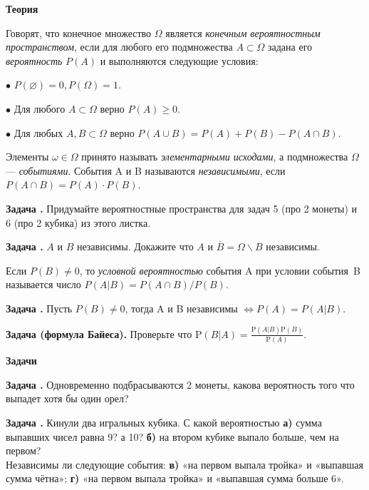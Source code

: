 \documentclass[11pt,a4paper]{article}
\def\P{\mathrm{P}}
\newcounter{znum}
\newcommand{\z}[1]{\addtocounter{znum}{1} \textbf{Задача \arabic{znum}#1. }}
\renewcommand{\!}{\textcolor{red}{!}}
\begin{document}
\pagestyle{empty}


\begin{center}
	\large
	\textbf{Теория}
	\normalsize
\end{center}

Говорят, что конечное множество $\Omega$ является \emph{конечным вероятностным пространством}, если для любого его подмножества $A \subset \Omega$ задана его \emph{вероятность} $P(A)$ и выполняются следующие условия:

$\bullet$ $P(\varnothing) = 0, P(\Omega) = 1$.

$\bullet$ Для любого $A \subset \Omega$ верно $P(A) \geqslant 0$.

$\bullet$ Для любых $A, B\subset \Omega$ верно $P(A\cup B) = P(A) + P(B) - P(A\cap B)$.

Элементы $\omega \in \Omega$ принято называть \emph{элементарными исходами}, а подмножества $\Omega$ --- \emph{событиями}. События A и B называются \emph{независимыми}, если $P(A \cap B) = P(A) \cdot P(B)$.

\z{} Придумайте вероятностные пространства для задач 5 (про 2 монеты) и 6 (про 2 кубика) из этого листка.

\z{} $A$ и $B$ независимы. Докажите что $A$ и $\overline{B} = \Omega \backslash B$ независимы.

\vspace{0.3cm}

Если $P(B) \ne 0$, то \emph{условной вероятностью} события A при условии события~B называется число $P(A|B) = P(A \cap B)/P(B)$.

\vspace{0.3cm}

\z{} Пусть $P(B) \ne 0$, тогда A и B независимы $ \Leftrightarrow P(A) = P(A|B)$.

\z{ (формула Байеса)} Проверьте что $\P(B | A) = \frac{\P(A | B)\P(B)}{\P(A)}$.

\begin{center}
	\large
	\textbf{Задачи}
	\normalsize
\end{center}

\z{} Одновременно подбрасываются 2 монеты, какова вероятность того что выпадет хотя бы один орел?

\z{} Кинули два игральных кубика. С какой вероятностью \textbf{а)} сумма выпавших чисел равна 9? а 10? \textbf{б)} на втором кубике выпало больше, чем на первом?\\
Независимы ли следующие события: \textbf{в)} «на первом выпала тройка» и «выпавшая сумма чётна»; \textbf{г)} «на первом выпала тройка» и «выпавшая сумма больше 6».
\end{document}
